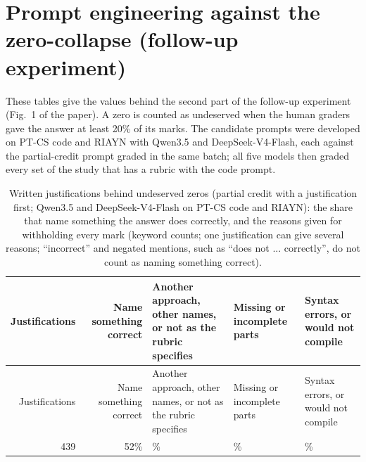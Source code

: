 \documentclass[10pt]{article}
\begin{document}
\section{Prompt engineering against the zero-collapse (follow-up experiment)}\label{sec:zerocollapse}
These tables give the values behind the second part of the follow-up experiment (Fig.~1 of the paper). A zero is counted as undeserved when the human graders gave the answer at least 20\% of its marks. The candidate prompts were developed on PT-CS code and RIAYN with Qwen3.5 and DeepSeek-V4-Flash, each against the partial-credit prompt graded in the same batch; all five models then graded every set of the study that has a rubric with the code prompt.
\begingroup\footnotesize
\begin{longtable}{rr>{\raggedright\arraybackslash}p{3.6cm}>{\raggedright\arraybackslash}p{3.0cm}>{\raggedright\arraybackslash}p{3.0cm}}
\caption{Written justifications behind undeserved zeros (partial credit with a justification first; Qwen3.5 and DeepSeek-V4-Flash on PT-CS code and RIAYN): the share that name something the answer does correctly, and the reasons given for withholding every mark (keyword counts; one justification can give several reasons; ``incorrect'' and negated mentions, such as ``does not ... correctly'', do not count as naming something correct).}\\
\hline
Justifications & Name something correct & Another approach, other names, or not as the rubric specifies & Missing or incomplete parts & Syntax errors, or would not compile \\ \hline
\endfirsthead
\hline
Justifications & Name something correct & Another approach, other names, or not as the rubric specifies & Missing or incomplete parts & Syntax errors, or would not compile \\ \hline
\endhead
439 & 52\% & 74\% & 57\% & 49\% \\
\hline
\end{longtable}
\endgroup
\end{document}
